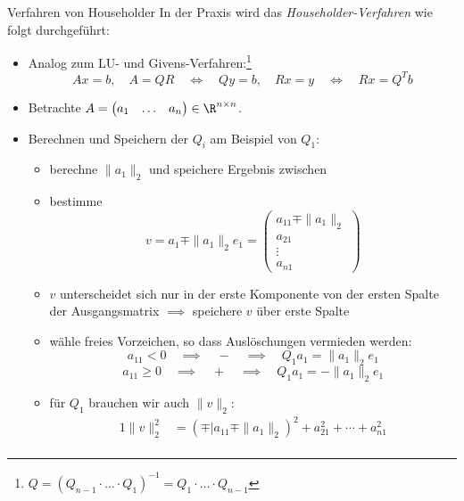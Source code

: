 \begin{defi}{Verfahren von Householder}
    In der Praxis wird das \emph{Householder-Verfahren} wie folgt durchgeführt: 
    \begin{itemize}
        \item Analog zum LU- und Givens-Verfahren:\footnote{$Q = (Q_{n-1} \cdot \ldots \cdot Q_1)^{-1} = Q_1 \cdot \ldots \cdot Q_{n-1}$}
              \[
                  Ax = b, \quad A = QR \quad \iff \quad Qy = b, \quad Rx = y \quad \iff \quad Rx = Q^T b
              \]
        \item Betrachte $A = \begin{pmatrix} a_1 & \ldots & a_n \end{pmatrix} \in \R^{n \times n}$.
        \item Berechnen und Speichern der $Q_i$ am Beispiel von $Q_1$:
              \begin{itemize}
                  \item berechne $\|a_1\|_2$ und speichere Ergebnis zwischen
                  \item bestimme
                        \[
                            v = a_1 \mp \|a_1\|_2 e_1 = 
                            \begin{pmatrix}
                                a_{11} \mp \|a_1\|_2 \\ 
                                a_{21}               \\ 
                                \vdots               \\
                                a_{n1}
                            \end{pmatrix}
                        \]
                  \item $v$ unterscheidet sich nur in der erste Komponente von der ersten Spalte der Ausgangsmatrix $\implies$ speichere $v$ über erste Spalte
                  \item wähle freies Vorzeichen, so dass Auslöschungen vermieden werden:
                        \[
                            a_{11} < 0 \quad \implies \quad - \quad \implies \quad Q_1a_1 = \|a_1\|_2 e_1 
                        \]
                        \[
                            a_{11} \geq 0 \quad \implies \quad + \quad \implies \quad Q_1a_1 = - \|a_1\|_2 e_1
                        \]
                  \item für $Q_1$ brauchen wir auch $\|v\|_2$:
                        \begin{alignat*}{1}
                            \|v\|_2^2 & = ( \mp | a_{11} \mp \|a_1\|_2 )^2 + a_{21}^2 + \cdots + a_{n1}^2                                         \\ 

\end{alignat*}
\end{itemize}
\end{itemize}
\end{defi}
